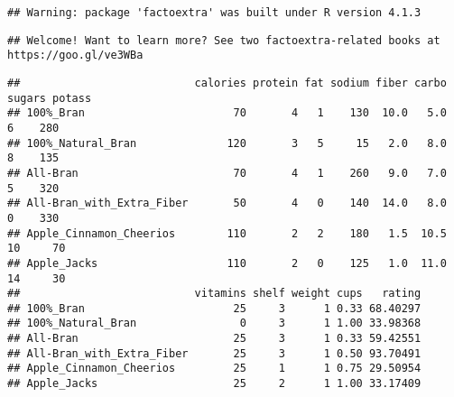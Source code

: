 \documentclass[
]{article}
\newenvironment{Shaded}{\begin{snugshade}}{\end{snugshade}}
\newcommand{\ConstantTok}[1]{\textcolor[rgb]{0.00,0.00,0.00}{#1}}
\newcommand{\DocumentationTok}[1]{\textcolor[rgb]{0.56,0.35,0.01}{\textbf{\textit{#1}}}}
\newcommand{\FunctionTok}[1]{\textcolor[rgb]{0.00,0.00,0.00}{#1}}
\newcommand{\NormalTok}[1]{#1}
\newcommand{\OtherTok}[1]{\textcolor[rgb]{0.56,0.35,0.01}{#1}}
\newcommand{\SpecialCharTok}[1]{\textcolor[rgb]{0.00,0.00,0.00}{#1}}
\newcommand{\StringTok}[1]{\textcolor[rgb]{0.31,0.60,0.02}{#1}}
\begin{document}
\begin{verbatim}
## Warning: package 'factoextra' was built under R version 4.1.3
\end{verbatim}

\begin{verbatim}
## Welcome! Want to learn more? See two factoextra-related books at https://goo.gl/ve3WBa
\end{verbatim}

\begin{Shaded}
\end{Shaded}

\begin{verbatim}
##                           calories protein fat sodium fiber carbo sugars potass
## 100%_Bran                       70       4   1    130  10.0   5.0      6    280
## 100%_Natural_Bran              120       3   5     15   2.0   8.0      8    135
## All-Bran                        70       4   1    260   9.0   7.0      5    320
## All-Bran_with_Extra_Fiber       50       4   0    140  14.0   8.0      0    330
## Apple_Cinnamon_Cheerios        110       2   2    180   1.5  10.5     10     70
## Apple_Jacks                    110       2   0    125   1.0  11.0     14     30
##                           vitamins shelf weight cups   rating
## 100%_Bran                       25     3      1 0.33 68.40297
## 100%_Natural_Bran                0     3      1 1.00 33.98368
## All-Bran                        25     3      1 0.33 59.42551
## All-Bran_with_Extra_Fiber       25     3      1 0.50 93.70491
## Apple_Cinnamon_Cheerios         25     1      1 0.75 29.50954
## Apple_Jacks                     25     2      1 1.00 33.17409
\end{verbatim}
\end{document}
